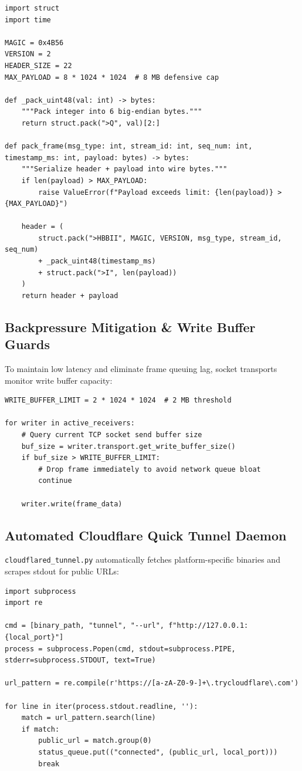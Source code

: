 \documentclass[11pt,a4paper]{article}
\begin{document}
\begin{lstlisting}[caption={Frame packing and 48-bit timestamp serialization in protocol.py}]
import struct
import time

MAGIC = 0x4B56
VERSION = 2
HEADER_SIZE = 22
MAX_PAYLOAD = 8 * 1024 * 1024  # 8 MB defensive cap

def _pack_uint48(val: int) -> bytes:
    """Pack integer into 6 big-endian bytes."""
    return struct.pack(">Q", val)[2:]

def pack_frame(msg_type: int, stream_id: int, seq_num: int, timestamp_ms: int, payload: bytes) -> bytes:
    """Serialize header + payload into wire bytes."""
    if len(payload) > MAX_PAYLOAD:
        raise ValueError(f"Payload exceeds limit: {len(payload)} > {MAX_PAYLOAD}")
    
    header = (
        struct.pack(">HBBII", MAGIC, VERSION, msg_type, stream_id, seq_num)
        + _pack_uint48(timestamp_ms)
        + struct.pack(">I", len(payload))
    )
    return header + payload
\end{lstlisting}

\subsection{Backpressure Mitigation \& Write Buffer Guards}
To maintain low latency and eliminate frame queuing lag, socket transports monitor write buffer capacity:

\begin{lstlisting}[caption={Write-buffer backpressure check in app.py}]
WRITE_BUFFER_LIMIT = 2 * 1024 * 1024  # 2 MB threshold

for writer in active_receivers:
    # Query current TCP socket send buffer size
    buf_size = writer.transport.get_write_buffer_size()
    if buf_size > WRITE_BUFFER_LIMIT:
        # Drop frame immediately to avoid network queue bloat
        continue
    
    writer.write(frame_data)
\end{lstlisting}

\subsection{Automated Cloudflare Quick Tunnel Daemon}
\texttt{cloudflared\_tunnel.py} automatically fetches platform-specific binaries and scrapes stdout for public URLs:

\begin{lstlisting}[caption={Subprocess launcher and regex parsing for Cloudflare Tunnel}]
import subprocess
import re

cmd = [binary_path, "tunnel", "--url", f"http://127.0.0.1:{local_port}"]
process = subprocess.Popen(cmd, stdout=subprocess.PIPE, stderr=subprocess.STDOUT, text=True)

url_pattern = re.compile(r'https://[a-zA-Z0-9-]+\.trycloudflare\.com')

for line in iter(process.stdout.readline, ''):
    match = url_pattern.search(line)
    if match:
        public_url = match.group(0)
        status_queue.put(("connected", (public_url, local_port)))
        break
\end{lstlisting}
\end{document}
